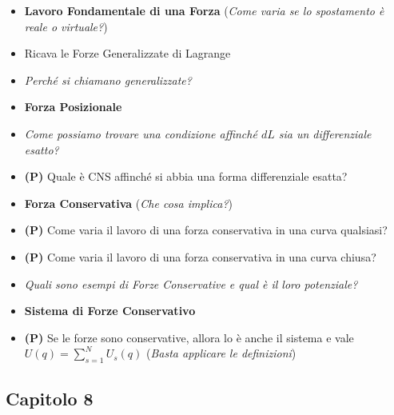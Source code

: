 \documentclass[11pt,a4paper,twoside]{article}
\begin{document}
\begin{itemize}
	\item \textbf{Lavoro Fondamentale di una Forza} (\textit{Come varia se lo spostamento è reale o virtuale?})
	\item Ricava le Forze Generalizzate di Lagrange
	\item \textit{Perché si chiamano generalizzate?}
	\item \textbf{Forza Posizionale}
	\item \textit{Come possiamo trovare una condizione affinché $dL$ sia un differenziale esatto?}
	\item \textbf{(P)} Quale è CNS affinché si abbia una forma differenziale esatta?
	\item \textbf{Forza Conservativa} (\textit{Che cosa implica?})
	\item \textbf{(P)} Come varia il lavoro di una forza conservativa in una curva qualsiasi?
	\item \textbf{(P)} Come varia il lavoro di una forza conservativa in una curva chiusa?
	\item \textit{Quali sono esempi di Forze Conservative e qual è il loro potenziale?}
	\item \textbf{Sistema di Forze Conservativo}
	\item \textbf{(P)} Se le forze sono conservative, allora lo è anche il sistema e vale $U(q) = \sum_{s=1}^{N} U_s(q)$ (\textit{Basta applicare le definizioni})
\end{itemize}

\subsection*{Capitolo 8}
\end{document}
